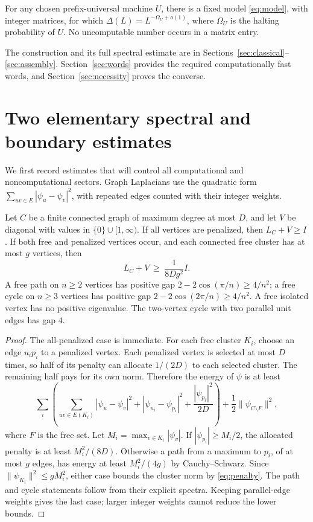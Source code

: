 \begin{corollary}\label{cor:omega}
For any chosen prefix-universal machine $U$, there is a fixed model
\eqref{eq:model}, with integer matrices, for which
$\Delta(L)=L^{-\Omega_U+o(1)}$, where $\Omega_U$ is the halting probability
of $U$. No uncomputable number occurs in a matrix entry.
\end{corollary}

The construction and its full spectral estimate are in
Sections~\ref{sec:classical}--\ref{sec:assembly}. Section~\ref{sec:words}
provides the required computationally fast words, and
Section~\ref{sec:necessity} proves the converse.

\section{Two elementary spectral and boundary estimates}\label{sec:lemmas}
We first record estimates that will control all computational and
noncomputational sectors. Graph Laplacians use the quadratic form
$\sum_{uv\in E}|\psi_u-\psi_v|^2$, with repeated edges counted with their
integer weights.

\begin{lemma}\label{lem:penalty}
Let $C$ be a finite connected graph of maximum degree at most $D$, and let
$V$ be diagonal with values in $\{0\}\cup[1,\infty)$. If all vertices
are penalized, then $L_C+V\geq I$. If both free and penalized vertices
occur, and each connected free cluster has at most $g$ vertices, then
\begin{equation}\label{eq:penalty}
 L_C+V\ \geq\ \frac{1}{8Dg^2}I.
\end{equation}
A free path on $n\geq2$ vertices has positive gap
$2-2\cos(\pi/n)\geq4/n^2$; a free cycle on $n\geq3$ vertices has positive
gap $2-2\cos(2\pi/n)\geq4/n^2$. A free isolated vertex has no positive
eigenvalue. The two-vertex cycle with two parallel unit edges has gap $4$.
\end{lemma}
\begin{proof}
The all-penalized case is immediate. For each free cluster $K_i$, choose an
edge $u_ip_i$ to a penalized vertex. Each penalized vertex is selected at
most $D$ times, so half of its penalty can allocate $1/(2D)$ to each
selected cluster. The remaining half pays for its own norm. Therefore the
energy of $\psi$ is at least
\[
 \sum_i\left(\sum_{uv\in E(K_i)}|\psi_u-\psi_v|^2+
 |\psi_{u_i}-\psi_{p_i}|^2+\frac{|\psi_{p_i}|^2}{2D}\right)
 +\frac12\|\psi_{C\setminus F}\|^2,
\]
where $F$ is the free set. Let $M_i=\max_{v\in K_i}|\psi_v|$.
If $|\psi_{p_i}|\geq M_i/2$, the allocated penalty is at least
$M_i^2/(8D)$. Otherwise a path from a maximum to $p_i$, of at most $g$
edges, has energy at least $M_i^2/(4g)$ by Cauchy--Schwarz. Since
$\|\psi_{K_i}\|^2\leq gM_i^2$, either case bounds the cluster norm by
\eqref{eq:penalty}. The path and cycle statements follow from their
explicit spectra. Keeping parallel-edge weights gives the last case;
larger integer weights cannot reduce the lower bounds.
\end{proof}

